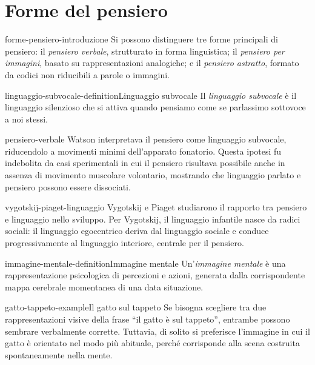 \documentclass[preview]{standalone}
\begin{document}
\genpage

\section{Forme del pensiero}

\begin{snippet}{forme-pensiero-introduzione}
    Si possono distinguere tre forme principali di pensiero: il
    \emph{pensiero verbale}, strutturato in forma linguistica; il
    \emph{pensiero per immagini}, basato su rappresentazioni analogiche; e il
    \emph{pensiero astratto}, formato da codici non riducibili a parole o
    immagini.
\end{snippet}

\begin{snippetdefinition}{linguaggio-subvocale-definition}{Linguaggio subvocale}
    Il \emph{linguaggio subvocale} è il linguaggio silenzioso che si attiva
    quando pensiamo come se parlassimo sottovoce a noi stessi.
\end{snippetdefinition}

\begin{snippet}{pensiero-verbale}
    Watson interpretava il pensiero come linguaggio subvocale, riducendolo a
    movimenti minimi dell'apparato fonatorio. Questa ipotesi fu indebolita da
    casi sperimentali in cui il pensiero risultava possibile anche in assenza di
    movimento muscolare volontario, mostrando che linguaggio parlato e pensiero
    possono essere dissociati.
\end{snippet}

\begin{snippet}{vygotskij-piaget-linguaggio}
    Vygotskij e Piaget studiarono il rapporto tra pensiero e linguaggio nello
    sviluppo. Per Vygotskij, il linguaggio infantile nasce da radici sociali: il
    linguaggio egocentrico deriva dal linguaggio sociale e conduce
    progressivamente al linguaggio interiore, centrale per il pensiero.
\end{snippet}

\begin{snippetdefinition}{immagine-mentale-definition}{Immagine mentale}
    Un'\emph{immagine mentale} è una rappresentazione psicologica di percezioni
    e azioni, generata dalla corrispondente mappa cerebrale momentanea di una
    data situazione.
\end{snippetdefinition}

\begin{snippetexample}{gatto-tappeto-example}{Il gatto sul tappeto}
    Se bisogna scegliere tra due rappresentazioni visive della frase ``il gatto
    è sul tappeto'', entrambe possono sembrare verbalmente corrette. Tuttavia,
    di solito si preferisce l'immagine in cui il gatto è orientato nel modo più
    abituale, perché corrisponde alla scena costruita spontaneamente nella
    mente.
\end{snippetexample}
\end{document}
